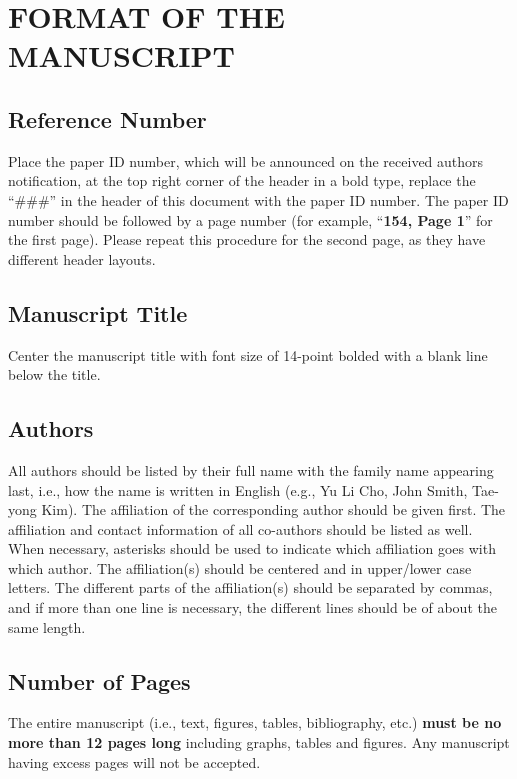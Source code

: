 \section{FORMAT OF THE MANUSCRIPT}
\label{sec:format}

\subsection{Reference Number}
Place the paper ID number, which will be announced on the received authors notification, at the top right corner of the header in a bold type, replace the ``\#\#\#'' in the header of this document with the paper ID number. The paper ID number should be followed by a page number (for example, ``\textbf{154, Page 1}'' for the first page). Please repeat this procedure for the second page, as they have different header layouts.

\subsection{Manuscript Title}
Center the manuscript title with font size of 14-point bolded with a blank line below the title.

\subsection{Authors}
All authors should be listed by their full name with the family name appearing last, i.e., how the name is written in English (e.g., Yu Li Cho, John Smith, Tae-yong Kim). The affiliation of the corresponding author should be given first. The affiliation and contact information of all co-authors should be listed as well. When necessary, asterisks should be used to indicate which affiliation goes with which author. The affiliation(s) should be centered and in upper/lower case letters. The different parts of the affiliation(s) should be separated by commas, and if more than one line is necessary, the different lines should be of about the same length.

\subsection{Number of Pages}
The entire manuscript (i.e., text, figures, tables, bibliography, etc.) \textbf{must be no more than 12 pages long} including graphs, tables and figures. Any manuscript having excess pages will not be accepted. 

